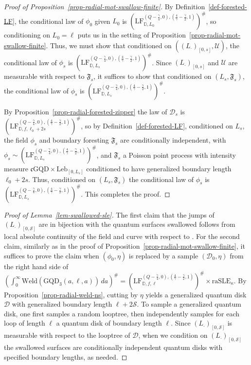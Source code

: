 \documentclass[a4paper]{article}
\numberwithin{equation}{section}
\newcommand{\bbD}{\mathbb{D}}
\newcommand{\D}{\mathbb{D}}
\newcommand{\cD}{\mathcal{D}}
\newcommand{\qduration}{\mathcal{S}}
\newcommand{\GQD}{\mathrm{GQD}}
\newcommand{\LF}{\mathrm{LF}}
\theoremstyle{remark}
\numberwithin{equation}{section}
\begin{document}
\begin{proof}[{Proof of Proposition~\ref{prop-radial-mot-swallow-finite}}]
By Definition~\ref{def-forested-LF}, the conditional law of $\phi_0$ given $L_0$ is $(\LF_{\D, L_0}^{(Q-\frac{\gamma}{4},0),(\frac4\gamma - \frac\gamma2,1)})^\#$, so conditioning on $L_0 = \ell$ puts us in the setting of Proposition~\ref{prop-radial-mot-swallow-finite}. Thus, we must show that conditioned on $((L_\cdot)_{[0,s]}, \mathcal U)$, the conditional law of $\phi_s$ is $(\LF_{\D, L_s}^{(Q-\frac{\gamma}{4},0),(\frac4\gamma - \frac\gamma2,1)})^\#$. 
Since $(L_\cdot)_{[0,s]}$ and $\mathcal U$ are measurable with respect to $\mathfrak F_s$, it suffices to show that conditioned on $(L_s, \mathfrak F_s)$, the conditional law of $\phi_s$ is $(\LF_{\D, L_s}^{(Q-\frac{\gamma}{4},0),(\frac4\gamma - \frac\gamma2,1)})^\#$. 

By Proposition~\ref{prop-radial-forested-zipper} the law of $\cD_s$ is  $(\LF_{\bbD, f, \ell_0+2s}^{(Q-\frac{\gamma}{4},0),(\frac4\gamma - \frac\gamma2,1)})^\#$, so by Definition~\ref{def-forested-LF}, conditioned on $L_s$, the field $\phi_s$ and boundary foresting $\mathfrak F_s$ are conditionally independent, with $\phi_s \sim (\LF_{\D, L_s}^{(Q-\frac{\gamma}{4},0),(\frac4\gamma - \frac\gamma2,1)})^\#$, and $\mathfrak F_s$ a Poisson point process with intensity measure $\mathfrak c \GQD \times \mathrm{Leb}_{[0,L_s]}$ conditioned to have generalized boundary length $\ell_0 + 2s$. Thus, conditioned on $(L_s, \mathfrak F_s)$ the conditional law of $\phi_s$ is $(\LF_{\D, L_s}^{(Q-\frac{\gamma}{4},0),(\frac4\gamma - \frac\gamma2,1)})^\#$. This completes the proof. 
\end{proof}

\begin{proof}[{Proof of Lemma~\ref{lem-swallowed-sle}}]
The first claim that the jumps of $(L_\cdot)_{[0,\qduration]}$ are in bijection with the quantum surfaces swallowed follows from local absolute continuity of the field and curve with respect to \cite[Theorem 1.4.7]{DMS14}. For the second claim, similarly as in the proof of Proposition~\ref{prop-radial-mot-swallow-finite}, it suffices to prove the claim when $(\phi_0, \eta)$ is replaced by a sample $(\cD_0, \eta)$ from the right hand side of $\left(\int_0^\infty \mathrm{Weld}(\GQD_{3}(a, \ell, a)) \, da \right)^\# = (\LF_{\mathbb D, f, \ell}^{(Q-\frac\gamma4, 0), (\frac4\gamma - \frac\gamma2, 1)})^\# \times \mathrm{raSLE}_\kappa$. By Proposition~\ref{prop-radial-weld-ns}, cutting by $\eta$ yields a generalized quantum disk $\cD$ with generalized boundary length $\ell + 2\qduration$. To sample a generalized quantum disk, one first samples a random looptree, then independently samples for each loop of length $\ell$ a quantum disk of boundary length $\ell$. Since $(L_\cdot)_{[0,\qduration]}$ is measurable with respect to the looptree of $\cD$, when we condition on $(L_\cdot)_{[0,\qduration]}$ the swallowed surfaces are conditionally independent quantum disks with specified boundary lengths, as needed. 
\end{proof}
\end{document}
